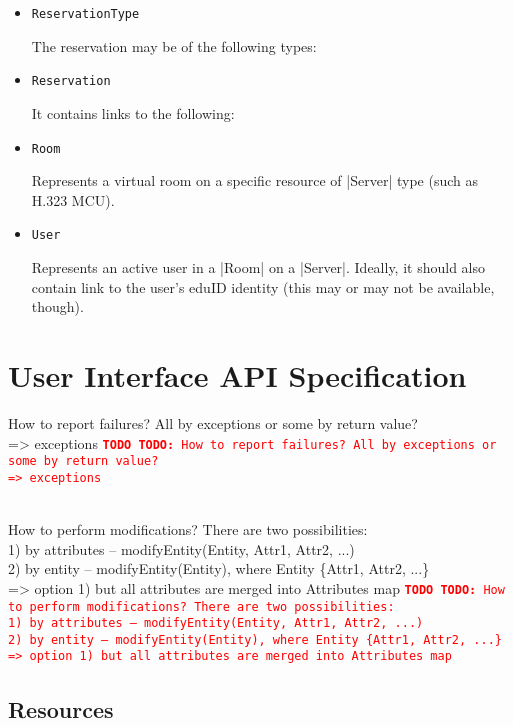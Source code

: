 \documentclass[a4paper]{report}
\newcommand{\APIcmd}[1]{%
\item \lstinline[style=myinline]!#1!%

}
\newenvironment{APIdef}{\begin{itemize}}{\end{itemize}}
\newcommand{\UCref}[1]{UC-\ref{UC:#1}}
\newcommand{\TODO}[1]{%
\def\empty{}%
\def\prvniparametr{#1}%
\ifx\prvniparametr\empty%
\begingroup\tt\textcolor{red}{\noindent\textbf{TODO}}\endgroup
\else%
\begingroup\tt\textcolor{red}{\noindent\textbf{TODO:}\ #1}\endgroup
\fi%
}
\begin{document}
\begin{APIdef}
\APIcmd{ReservationType}
The reservation may be of the following types:

\APIcmd{Reservation}
It contains links to the following:

\APIcmd{Room}
Represents a virtual room on a specific resource of |Server| type (such as H.323 MCU).

\APIcmd{User}
Represents an active user in a |Room| on a |Server|. Ideally, it should also contain link to the user's eduID identity (this may or may not be available, though).

\end{APIdef}




\chapter{User Interface API Specification}

\TODO{How to report failures? All by exceptions or some by return value? 
    \\ => exceptions}
\\
\TODO{How to perform modifications? There are two possibilities: 
    \\ 1) by attributes -- modifyEntity(Entity, Attr1, Attr2, ...)
    \\ 2) by entity -- modifyEntity(Entity), where Entity \{Attr1, Attr2, ...\}
    \\ => option 1) but all attributes are merged into Attributes map}

\section{Resources}
\end{document}
